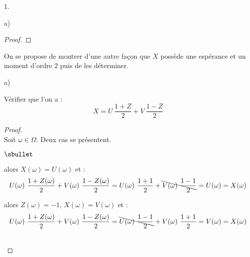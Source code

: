 \documentclass[11pt]{article}%
\begin{document}
\begin{noliste}{1.}
\begin{noliste}{a)}
\begin{proof}
    \end{proof}    
  \end{noliste}


  
\item On se propose de montrer d'une autre façon que $X$ possède une
  espérance et un moment d'ordre $2$ puis de les déterminer.

  \begin{noliste}{a)}
    \setlength{\itemsep}{2mm}
  \item Vérifier que l'on a :
    \[
    X = U \ \dfrac{1 + Z}{2} + V \ \dfrac{1-Z}{2}
    \]    

    \begin{proof}~\\
      Soit $\omega \in \Omega$. Deux cas se présentent.
      \begin{noliste}{$\sbullet$}
      \item {} alors $X(\omega) =
        U(\omega)$ et :
        \[
        U(\omega) \ \dfrac{1+Z(\omega)}{2} + V(\omega) \
        \dfrac{1-Z(\omega)}{2} = U(\omega) \ \dfrac{1+1}{2} +
        \bcancel{V(\omega) \ \dfrac{1-1}{2}} = U(\omega) = X(\omega)
        \]
      \item {} alors $Z(\omega) = -1$,
        $X(\omega) = V(\omega)$ et :
        \[
        U(\omega) \ \dfrac{1+Z(\omega)}{2} + V(\omega) \
        \dfrac{1-Z(\omega)}{2} = \bcancel{U(\omega) \ \dfrac{1-1}{2}}
        + V(\omega) \ \dfrac{1+1}{2} = V(\omega) = X(\omega)
        \]    
      \end{noliste}
      ~\\[-1cm]
    \end{proof}



\end{noliste}
\end{noliste}
\end{document}
